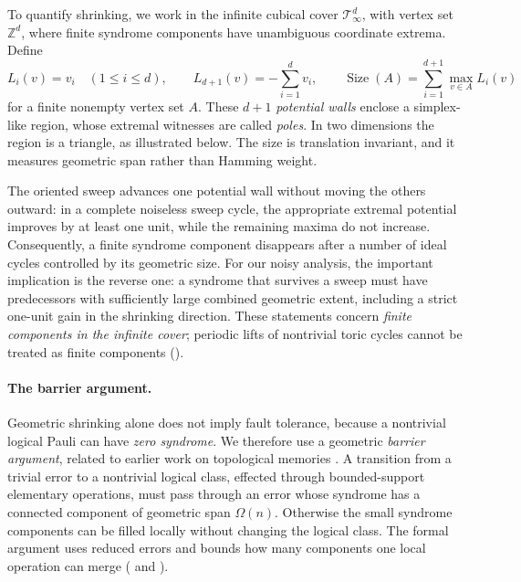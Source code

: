 To quantify shrinking, we work in the infinite cubical cover $\mathcal T_\infty^d$, with vertex set $\mathbb Z^d$, where finite syndrome components have unambiguous coordinate extrema. Define
\begin{equation*}
  L_i(v)=v_i\quad (1\leq i\leq d),
  \qquad L_{d+1}(v)=-\sum_{i=1}^{d}v_i,
  \qquad
  \operatorname{Size}(A)=\sum_{i=1}^{d+1}\max_{v\in A}L_i(v)
\end{equation*}
for a finite nonempty vertex set $A$. These $d+1$ \emph{potential walls} enclose a simplex-like region, whose extremal witnesses are called \emph{poles}. In two dimensions the region is a triangle, as illustrated below. The size is translation invariant, and it measures geometric span rather than Hamming weight.



The oriented sweep advances one potential wall without moving the others outward: in a complete noiseless sweep cycle, the appropriate extremal potential improves by at least one unit, while the remaining maxima do not increase. Consequently, a finite syndrome component disappears after a number of ideal cycles controlled by its geometric size. For our noisy analysis, the important implication is the reverse one: a syndrome that survives a sweep must have predecessors with sufficiently large combined geometric extent, including a strict one-unit gain in the shrinking direction. These statements concern \emph{finite components in the infinite cover}; periodic lifts of nontrivial toric cycles cannot be treated as finite components ().

\paragraph{The barrier argument.}
Geometric shrinking alone does not imply fault tolerance, because a nontrivial logical Pauli can have \emph{zero syndrome}. We therefore use a geometric \emph{barrier argument}, related to earlier work on topological memories \cite{Dennis_2002,BravyiTerhal2009,BombinEtAl2013}. A transition from a trivial error to a nontrivial logical class, effected through bounded-support elementary operations, must pass through an error whose syndrome has a connected component of geometric span $\Omega(n)$. Otherwise the small syndrome components can be filled locally without changing the logical class. The formal argument uses reduced errors and bounds how many components one local operation can merge (  and ).

